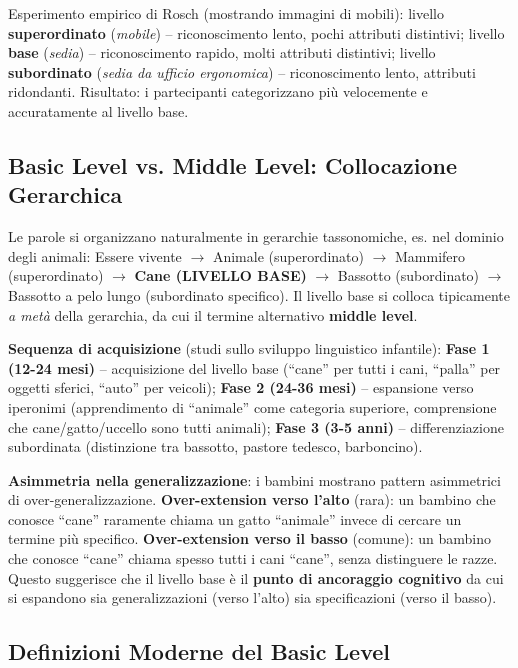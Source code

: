 \documentclass[12pt,a4paper]{article}
\begin{document}
\begin{examplebox}
Esperimento empirico di Rosch (mostrando immagini di mobili): livello \textbf{superordinato} (\textit{mobile}) -- riconoscimento lento, pochi attributi distintivi; livello \textbf{base} (\textit{sedia}) -- riconoscimento rapido, molti attributi distintivi; livello \textbf{subordinato} (\textit{sedia da ufficio ergonomica}) -- riconoscimento lento, attributi ridondanti. Risultato: i partecipanti categorizzano pi\`u velocemente e accuratamente al livello base.
\end{examplebox}

\subsection{Basic Level vs. Middle Level: Collocazione Gerarchica}

Le parole si organizzano naturalmente in gerarchie tassonomiche, es. nel dominio degli animali: Essere vivente $\to$ Animale (superordinato) $\to$ Mammifero (superordinato) $\to$ \textbf{Cane (LIVELLO BASE)} $\to$ Bassotto (subordinato) $\to$ Bassotto a pelo lungo (subordinato specifico). Il livello base si colloca tipicamente \emph{a met\`a} della gerarchia, da cui il termine alternativo \textbf{middle level}.

\textbf{Sequenza di acquisizione} (studi sullo sviluppo linguistico infantile): \textbf{Fase 1 (12-24 mesi)} -- acquisizione del livello base (``cane'' per tutti i cani, ``palla'' per oggetti sferici, ``auto'' per veicoli); \textbf{Fase 2 (24-36 mesi)} -- espansione verso iperonimi (apprendimento di ``animale'' come categoria superiore, comprensione che cane/gatto/uccello sono tutti animali); \textbf{Fase 3 (3-5 anni)} -- differenziazione subordinata (distinzione tra bassotto, pastore tedesco, barboncino).

\textbf{Asimmetria nella generalizzazione}: i bambini mostrano pattern asimmetrici di over-generalizzazione. \textbf{Over-extension verso l'alto} (rara): un bambino che conosce ``cane'' raramente chiama un gatto ``animale'' invece di cercare un termine pi\`u specifico. \textbf{Over-extension verso il basso} (comune): un bambino che conosce ``cane'' chiama spesso tutti i cani ``cane'', senza distinguere le razze. Questo suggerisce che il livello base \`e il \textbf{punto di ancoraggio cognitivo} da cui si espandono sia generalizzazioni (verso l'alto) sia specificazioni (verso il basso).

\subsection{Definizioni Moderne del Basic Level}
\end{document}
